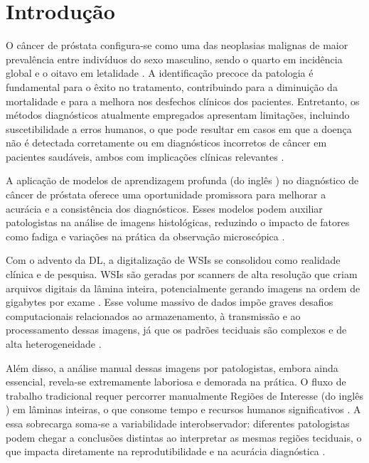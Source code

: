 \chapter{Introdução}\label{chp:Introducao}

O câncer de próstata configura-se como uma das neoplasias malignas de maior prevalência entre indivíduos do sexo masculino, sendo o quarto em incidência global e o oitavo em letalidade \cite{Ferlay_GCO_2024}. A identificação precoce da patologia é fundamental para o êxito no tratamento, contribuindo para a diminuição da mortalidade e para a melhora nos desfechos clínicos dos pacientes. Entretanto, os métodos diagnósticos atualmente empregados apresentam limitações, incluindo suscetibilidade a erros humanos, o que pode resultar em casos em que a doença não é detectada corretamente ou em diagnósticos incorretos de câncer em pacientes saudáveis, ambos com implicações clínicas relevantes \cite{Beltran2019}.

A aplicação de modelos de aprendizagem profunda (do inglês ) no diagnóstico de câncer de próstata oferece uma oportunidade promissora para melhorar a acurácia e a consistência dos diagnósticos. Esses modelos podem auxiliar patologistas na análise de imagens histológicas, reduzindo o impacto de fatores como fadiga e variações na prática da observação microscópica \cite{Perincheri2021}.

 Com o advento da DL, a digitalização de WSIs se consolidou como realidade clínica e de pesquisa. WSIs são geradas por scanners de alta resolução que criam arquivos digitais da lâmina inteira, potencialmente gerando imagens na ordem de gigabytes por exame \cite{Pantanowitz2011}. Esse volume massivo de dados impõe graves desafios computacionais relacionados ao armazenamento, à transmissão e ao processamento dessas imagens, já que os padrões teciduais são complexos e de alta heterogeneidade \cite{Gurcan2009}.

Além disso, a análise manual dessas imagens por patologistas, embora ainda essencial, revela-se extremamente laboriosa e demorada na prática. O fluxo de trabalho tradicional requer percorrer manualmente Regiões de Interesse (do inglês ) em lâminas inteiras, o que consome tempo e recursos humanos significativos \cite{SchomigMarkiefka2021}. A essa sobrecarga soma-se a variabilidade interobservador: diferentes patologistas podem chegar a conclusões distintas ao interpretar as mesmas regiões teciduais, o que impacta diretamente na reprodutibilidade e na acurácia diagnóstica \cite{CAP2018}.

